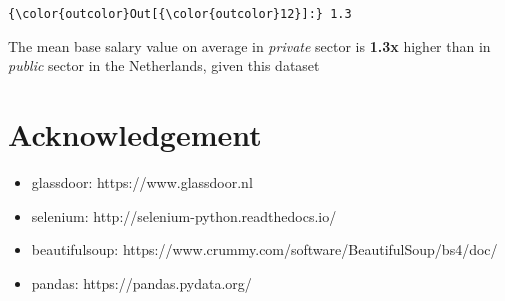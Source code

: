 \documentclass[11pt]{article}
\providecommand{\tightlist}{%
      \setlength{\itemsep}{0pt}\setlength{\parskip}{0pt}}
\begin{document}
\begin{Verbatim}[commandchars=\\\{\}]
{\color{outcolor}Out[{\color{outcolor}12}]:} 1.3
\end{Verbatim}
            
    The mean base salary value on average in \emph{private} sector is
\textbf{1.3x} higher than in \emph{public} sector in the Netherlands,
given this dataset

    \section{Acknowledgement}\label{acknowledgement}

\begin{itemize}
\tightlist
\item
  glassdoor: https://www.glassdoor.nl
\item
  selenium: http://selenium-python.readthedocs.io/
\item
  beautifulsoup: https://www.crummy.com/software/BeautifulSoup/bs4/doc/
\item
  pandas: https://pandas.pydata.org/
\end{itemize}


    
    
    
    
\end{document}
